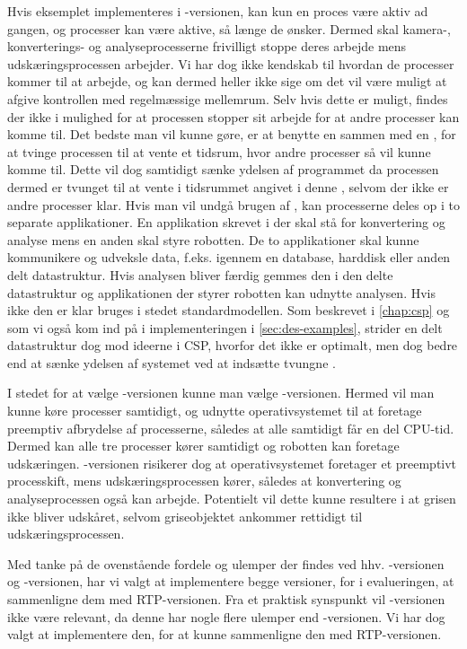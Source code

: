 Hvis eksemplet implementeres i -versionen, kan kun  en proces være aktiv ad gangen, og processer kan være aktive, så længe de ønsker. Dermed skal kamera-, konverterings- og analyseprocesserne frivilligt stoppe deres arbejde mens  udskæringsprocessen arbejder.  Vi har dog ikke kendskab til hvordan de processer kommer til at arbejde, og kan dermed heller ikke sige om det vil være muligt at afgive kontrollen med regelmæssige mellemrum. Selv hvis dette er muligt, findes der ikke i \pycsp mulighed for at processen stopper sit arbejde for at andre  processer kan komme til. Det bedste man vil kunne gøre, er at benytte en   sammen med en , for at tvinge processen til at vente et tidsrum, hvor andre processer så vil kunne komme til. Dette vil dog samtidigt sænke ydelsen af programmet da processen dermed er tvunget til at vente i tidsrummet angivet i denne , selvom der ikke er andre processer klar. Hvis man vil undgå brugen af , kan processerne deles op i to separate applikationer. En applikation skrevet i \pycsp der skal stå for konvertering og analyse mens en anden skal styre robotten. De to applikationer skal kunne kommunikere og  udveksle data, f.eks. igennem en database, harddisk eller anden delt datastruktur. Hvis analysen bliver færdig gemmes den i den delte datastruktur og applikationen der styrer robotten kan udnytte analysen. Hvis ikke den er klar bruges i stedet standardmodellen. Som beskrevet i \autoref{chap:csp} og som vi også kom ind på i implementeringen i \autoref{sec:des-examples}, strider en delt datastruktur dog mod ideerne i CSP, hvorfor det ikke er optimalt, men dog bedre end at sænke ydelsen af systemet ved at indsætte tvungne .

I stedet for at vælge -versionen kunne man vælge -versionen. Hermed vil man kunne køre processer samtidigt, og udnytte operativsystemet til at foretage preemptiv afbrydelse af processerne, således at alle samtidigt får en del CPU-tid. Dermed kan alle tre processer kører samtidigt og robotten kan foretage udskæringen. -versionen risikerer dog at operativsystemet foretager et preemptivt processkift, mens udskæringsprocessen kører, således at konvertering og  analyseprocessen også kan arbejde. Potentielt vil dette kunne resultere i at grisen ikke bliver udskåret, selvom griseobjektet ankommer rettidigt til udskæringsprocessen.

Med tanke på de ovenstående fordele og ulemper der findes ved hhv.  -versionen og -versionen,  har vi valgt at implementere begge versioner, for i evalueringen, at sammenligne dem med RTP-versionen. Fra et praktisk synspunkt vil -versionen ikke være relevant, da denne har nogle flere ulemper end -versionen. Vi har dog valgt at implementere den, for at kunne sammenligne den med RTP-versionen. 

